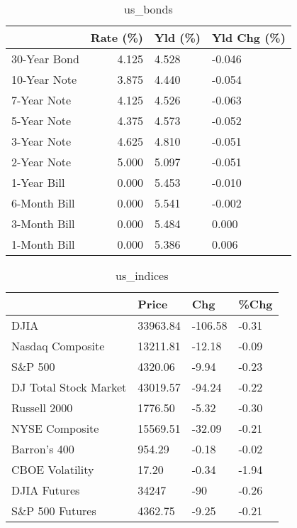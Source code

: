 \documentclass{article}%
\begin{document}
%


\begin{table}[htbp]%
\caption{us\_bonds}%
\centering%
\begin{adjustbox}{width=1\textwidth}%
\begin{tabular}{lrll}
\toprule
             &  Rate (\%) & Yld (\%) & Yld Chg (\%) \\
\midrule
30-Year Bond &     4.125 &   4.528 &      -0.046 \\
10-Year Note &     3.875 &   4.440 &      -0.054 \\
 7-Year Note &     4.125 &   4.526 &      -0.063 \\
 5-Year Note &     4.375 &   4.573 &      -0.052 \\
 3-Year Note &     4.625 &   4.810 &      -0.051 \\
 2-Year Note &     5.000 &   5.097 &      -0.051 \\
 1-Year Bill &     0.000 &   5.453 &      -0.010 \\
6-Month Bill &     0.000 &   5.541 &      -0.002 \\
3-Month Bill &     0.000 &   5.484 &       0.000 \\
1-Month Bill &     0.000 &   5.386 &       0.006 \\
\bottomrule
\end{tabular}
%
\end{adjustbox}%
\end{table}

%


\begin{table}[htbp]%
\caption{us\_indices}%
\centering%
\begin{adjustbox}{width=1\textwidth}%
\begin{tabular}{llll}
\toprule
                      &    Price &     Chg &  \%Chg \\
\midrule
                 DJIA & 33963.84 & -106.58 & -0.31 \\
     Nasdaq Composite & 13211.81 &  -12.18 & -0.09 \\
              S\&P 500 &  4320.06 &   -9.94 & -0.23 \\
DJ Total Stock Market & 43019.57 &  -94.24 & -0.22 \\
         Russell 2000 &  1776.50 &   -5.32 & -0.30 \\
       NYSE Composite & 15569.51 &  -32.09 & -0.21 \\
         Barron's 400 &   954.29 &   -0.18 & -0.02 \\
      CBOE Volatility &    17.20 &   -0.34 & -1.94 \\
         DJIA Futures &    34247 &     -90 & -0.26 \\
      S\&P 500 Futures &  4362.75 &   -9.25 & -0.21 \\
\bottomrule
\end{tabular}
%
\end{adjustbox}%
\end{table}
\end{document}
